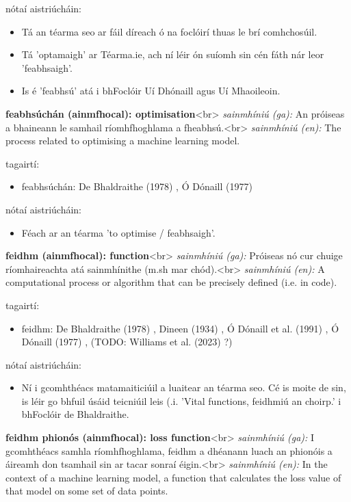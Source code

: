 \documentclass{article}
\begin{document}
nótaí aistriúcháin:
\begin{itemize}
	\item Tá an téarma seo ar fáil díreach ó na foclóirí thuas le brí comhchosúil.
	\item Tá 'optamaigh' ar Téarma.ie, ach ní léir ón suíomh sin cén fáth nár leor 'feabhsaigh'.
	\item Is é 'feabhsú' atá i bhFoclóir Uí Dhónaill agus Uí Mhaoileoin.
\end{itemize}


\textbf{feabhsúchán (ainmfhocal): optimisation}<br>
\textit{sainmhíniú (ga):} An próiseas a bhaineann le samhail ríomhfhoghlama a fheabhsú.<br>
\textit{sainmhíniú (en):} The process related to optimising a machine learning model.

tagairtí:
\begin{itemize}
	\item feabhsúchán: De Bhaldraithe (1978) \cite{de-bhaldraithe}, Ó Dónaill (1977) \cite{odonaill}
\end{itemize}

nótaí aistriúcháin:
\begin{itemize}
	\item Féach ar an téarma 'to optimise / feabhsaigh'.
\end{itemize}


\textbf{feidhm (ainmfhocal): function}<br>
\textit{sainmhíniú (ga):} Próiseas nó cur chuige ríomhaireachta atá sainmhínithe (m.sh mar chód).<br>
\textit{sainmhíniú (en):} A computational process or algorithm that can be precisely defined (i.e. in code).

tagairtí:
\begin{itemize}
	\item feidhm: De Bhaldraithe (1978) \cite{de-bhaldraithe}, Dineen (1934) \cite{dineen}, Ó Dónaill et al. (1991) \cite{focloir-beag}, Ó Dónaill (1977) \cite{odonaill}, (TODO: Williams et al. (2023) \cite{storchiste}?)
\end{itemize}

nótaí aistriúcháin:
\begin{itemize}
	\item Ní i gcomhthéacs matamaiticiúil a luaitear an téarma seo. Cé is moite de sin, is léir go bhfuil úsáid teicniúil leis (.i. 'Vital functions, feidhmiú an choirp.' i bhFoclóir de Bhaldraithe.
\end{itemize}


\textbf{feidhm phionós (ainmfhocal): loss function}<br>
\textit{sainmhíniú (ga):} I gcomhthéacs samhla ríomhfhoghlama, feidhm a dhéanann luach an phionóis a áireamh don tsamhail sin ar tacar sonraí éigin.<br>
\textit{sainmhíniú (en):} In the context of a machine learning model, a function that calculates the loss value of that model on some set of data points.
\end{document}
